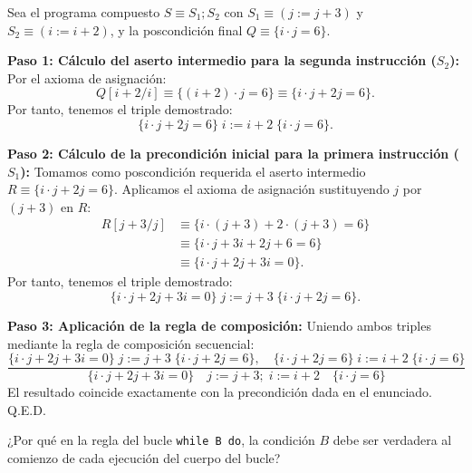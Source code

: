 \begin{solucion}
Sea el programa compuesto $S \equiv S_1; S_2$ con $S_1 \equiv (j := j + 3)$ y $S_2 \equiv (i := i + 2)$, y la poscondición final $Q \equiv \{i \cdot j = 6\}$.

\textbf{Paso 1: Cálculo del aserto intermedio para la segunda instrucción ($S_2$):}
Por el axioma de asignación:
\[
Q[i + 2 / i] \equiv \{(i + 2) \cdot j = 6\} \equiv \{i \cdot j + 2j = 6\}.
\]
Por tanto, tenemos el triple demostrado:
\[
\{i \cdot j + 2j = 6\} \; i := i + 2 \; \{i \cdot j = 6\}.
\]

\textbf{Paso 2: Cálculo de la precondición inicial para la primera instrucción ($S_1$):}
Tomamos como poscondición requerida el aserto intermedio $R \equiv \{i \cdot j + 2j = 6\}$.
Aplicamos el axioma de asignación sustituyendo $j$ por $(j + 3)$ en $R$:
\begin{align*}
R[j + 3 / j] &\equiv \{i \cdot (j + 3) + 2 \cdot (j + 3) = 6\} \\
&\equiv \{i \cdot j + 3i + 2j + 6 = 6\} \\
&\equiv \{i \cdot j + 2j + 3i = 0\}.
\end{align*}
Por tanto, tenemos el triple demostrado:
\[
\{i \cdot j + 2j + 3i = 0\} \; j := j + 3 \; \{i \cdot j + 2j = 6\}.
\]

\textbf{Paso 3: Aplicación de la regla de composición:}
Uniendo ambos triples mediante la regla de composición secuencial:
\[
\frac{\{i \cdot j + 2j + 3i = 0\} \; j := j + 3 \; \{i \cdot j + 2j = 6\}, \quad \{i \cdot j + 2j = 6\} \; i := i + 2 \; \{i \cdot j = 6\}}{\{i \cdot j + 2j + 3i = 0\} \quad j := j + 3; \; i := i + 2 \quad \{i \cdot j = 6\}}
\]
El resultado coincide exactamente con la precondición dada en el enunciado. Q.E.D.
\end{solucion}

\begin{ejercicio}
¿Por qué en la regla del bucle \texttt{while B do}, la condición $B$ debe ser verdadera al comienzo de cada ejecución del cuerpo del bucle?
\end{ejercicio}


